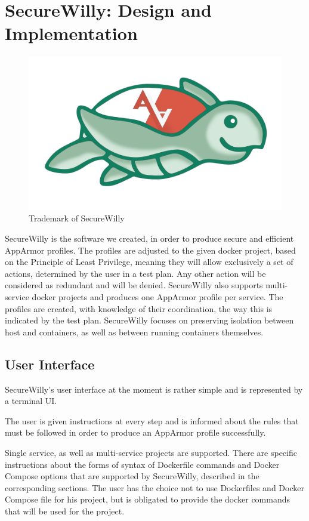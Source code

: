 \chapter{SecureWilly: Design and Implementation}
\begin{figure}[h!]
   \centering
   \includegraphics[width=0.45\linewidth]{./figures/trt.png}
   \caption{Trademark of SecureWilly}
\end{figure}

SecureWilly is the software we created, in order to produce secure and efficient AppArmor profiles. The profiles are adjusted to the given docker project, based on the Principle of Least Privilege, meaning they will allow exclusively a set of actions, determined by the user in a test plan. Any other action will be considered as redundant and will be denied. SecureWilly also supports multi-service docker projects and produces one AppArmor profile per service. The profiles are created, with knowledge of their coordination, the way this is indicated by the test plan. SecureWilly focuses on preserving isolation between host and containers, as well as between running containers themselves.

\section{User Interface}

SecureWilly's user interface at the moment is rather simple and is represented by a terminal UI.

The user is given instructions at every step and is informed about the rules that must be followed in order to produce an AppArmor profile successfully.

Single service, as well as multi-service projects are supported. There are specific instructions about the forms of syntax of Dockerfile commands and Docker Compose options that are supported by SecureWilly, described in the corresponding sections. The user has the choice not to use Dockerfiles and Docker Compose file for his project, but is obligated to provide the docker commands that will be used for the project.

